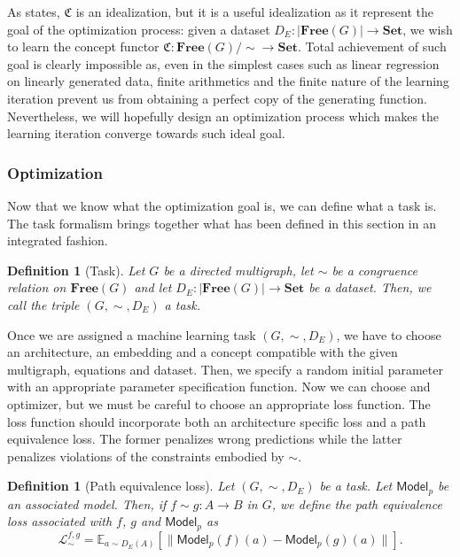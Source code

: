 \documentclass[12pt,a4paper,openright,twoside]{report}
\theoremstyle{plain}
\newtheorem{definition}[proposition]{Definition}
\theoremstyle{definition}
\begin{document}
As \cite{gavranovic2019compositional} states, $\mathfrak{C}$ is an idealization, but it is a useful idealization as it represent the goal of the optimization process: given a dataset $D_E: |\mathbf{Free}(G)| \to \mathbf{Set}$, we wish to learn the concept functor $\mathfrak{C}: \mathbf{Free}(G)/{\sim} \to \mathbf{Set}$. Total achievement of such goal is clearly impossible as, even in the simplest cases such as linear regression on linearly generated data, finite arithmetics and the finite nature of the learning iteration prevent us from obtaining a perfect copy of the generating function.
Nevertheless, we will hopefully design an optimization process which makes the learning iteration converge towards such ideal goal.

\subsubsection{Optimization}

Now that we know what the optimization goal is, we can define what a task is. The task formalism brings together what has been defined in this section in an integrated fashion.

\begin{definition}[Task]
  Let $G$ be a directed multigraph, let ${\sim}$ be a congruence relation on $\mathbf{Free}(G)$ and let $D_E: |\mathbf{Free}(G)| \to \mathbf{Set}$ be a dataset. Then, we call the triple $(G,{\sim},D_E)$ a task.
\end{definition}

Once we are assigned a machine learning task $(G,{\sim},D_E)$, we have to choose an architecture, an embedding and a concept compatible with the given multigraph, equations and dataset. Then, we specify a random initial parameter with an appropriate parameter specification function. Now we can choose and optimizer, but we must be careful to choose an appropriate loss function. The loss function should incorporate both an architecture specific loss and a path equivalence loss. The former penalizes wrong predictions while the latter penalizes violations of the constraints embodied by ${\sim}$.

\begin{definition}[Path equivalence loss]
  Let $(G,{\sim},D_E)$ be a task. Let $\mathsf{Model}_p$ be an associated model. Then, if $f \sim g: A \to B$ in $G$, we define the path equivalence loss associated with $f$, $g$ and $\mathsf{Model}_p$ as 
  \[\mathcal{L}_{\sim}^{f,g} = \mathbb{E}_{a \sim D_E(A)}[\|\mathsf{Model}_p(f)(a) - \mathsf{Model}_p(g)(a)\|].\]  
\end{definition}
\end{document}

